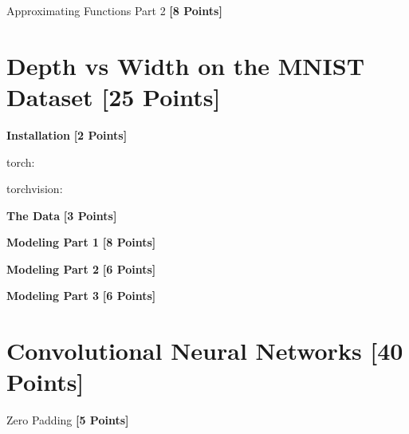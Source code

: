 \newpage


\problem Approximating Functions Part 2 \textbf{[8 Points]}

\begin{subsolution}

\end{subsolution}


\newpage
\section{Depth vs Width on the MNIST Dataset  [25 Points]}

\problem \textbf{Installation} \textbf{[2 Points]}

\begin{solution}

torch:

torchvision:

\end{solution}

\newpage



\problem \textbf{The Data} \textbf{[3 Points]}

\begin{subsolution}

\end{subsolution}

\newpage



 \problem \textbf{Modeling Part 1} \textbf{[8 Points]}

\begin{solution}

\end{solution}

\newpage


 \problem \textbf{Modeling Part 2} \textbf{[6 Points]}

 \begin{solution}

\end{solution}

\newpage


  \problem \textbf{Modeling Part 3} \textbf{[6 Points]}

  \begin{solution}

\end{solution}

 \newpage
 \section{Convolutional Neural Networks  [40 Points]}
 \problem Zero Padding \textbf{[5 Points]}

